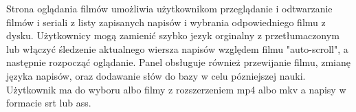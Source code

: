 Strona oglądania filmów umożliwia użytkownikom przeglądanie i odtwarzanie filmów i seriali z listy zapisanych napisów i wybrania odpowiedniego filmu z dysku. Użytkownicy mogą zamienić szybko jezyk orginalny z przetłumaczonym lub włączyć śledzenie aktualnego wiersza napisów względem filmu "auto-scroll", a następnie rozpocząć oglądanie. Panel obsługuje również przewijanie filmu, zmianę języka napisów, oraz dodawanie słów do bazy w celu pózniejszej nauki. Użytkownik ma do wyboru albo filmy z rozszerzeniem mp4 albo mkv a napisy w formacie srt lub ass.

